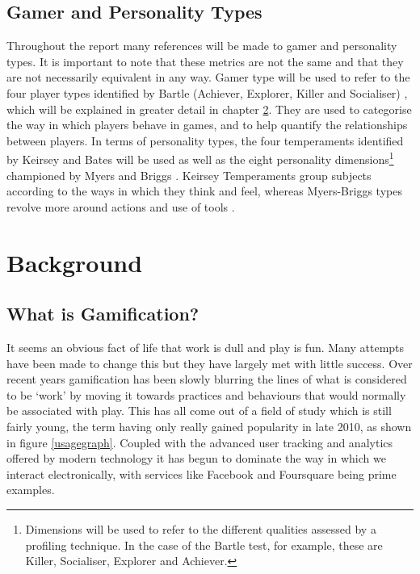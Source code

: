 \documentclass[12pt,a4paper,twoside]{report}
\begin{document}
\section{Gamer and Personality Types}
Throughout the report many references will be made to gamer and personality types. It is important to note that these metrics are not the same and that they are not necessarily equivalent in any way. Gamer type will be used to refer to the four player types identified by Bartle (Achiever, Explorer, Killer and Socialiser) \cite{bartle1996hearts}, which will be explained in greater detail in chapter \ref{sec:background}. They are used to categorise the way in which players behave in games, and to help quantify the relationships between players. In terms of personality types, the four temperaments identified by Keirsey and Bates \cite{keirsey1998please} \cite{keirsey1984} will be used as well as the eight personality dimensions\footnote{Dimensions will be used to refer to the different qualities assessed by a profiling technique. In the case of the Bartle test, for example, these are Killer, Socialiser, Explorer and Achiever.} championed by Myers and Briggs \cite{myers1995gifts}. Keirsey Temperaments group subjects according to the ways in which they think and feel, whereas Myers-Briggs types revolve more around actions and use of tools \cite{keirsey1984}.

\chapter{Background}
\label{sec:background}
\section{What is Gamification?}
It seems an obvious fact of life that work is dull and play is fun. Many attempts have been made to change this but they have largely met with little success. Over recent years gamification has been slowly blurring the lines of what is considered to be `work' by moving it towards practices and behaviours that would normally be associated with play. This has all come out of a field of study which is still fairly young, the term having only really gained popularity in late 2010, as shown in figure \ref{usagegraph}. Coupled with the advanced user tracking and analytics offered by modern technology it has begun to dominate the way in which we interact electronically, with services like Facebook and Foursquare being prime examples.
\end{document}
